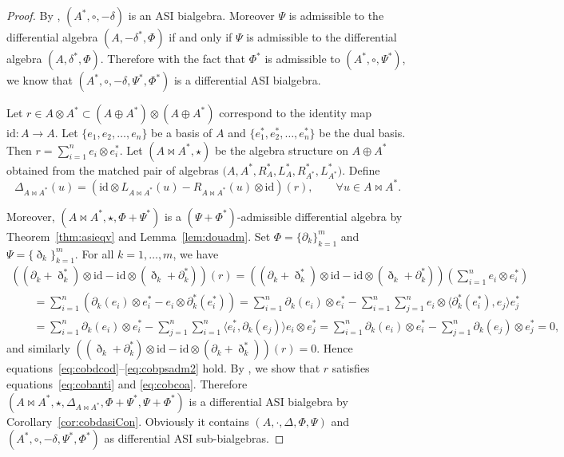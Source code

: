 \documentclass[10pt,a4paper]{amsart}
\numberwithin{equation}{section}
\newcommand{\id}{\mathrm{id}}
\begin{document}
\begin{proof}
 By \cite[Remark 2.2.4]{BaiDouble}, $(A^*, \circ,-\delta)$ is an ASI bialgebra.
 Moreover $\Psi$ is admissible to the differential algebra $(A, -\delta^*, \Phi)$ if and only if $\Psi$ is admissible to the differential algebra $(A, \delta^*, \Phi)$.
 Therefore with the fact that $\Phi^*$ is admissible to $(A^*, \circ, \Psi^*)$, we know that $(A^*, \circ, -\delta, \Psi^*, \Phi^*)$ is a differential ASI bialgebra.

 Let $r \in A \otimes A^* \subset (A \oplus A^*) \otimes (A \oplus A^*)$ correspond to the identity map $\id: A \to A$.
 Let $\{e_1,e_2,\dots,e_n\}$ be a basis of $A$ and $\{e_1^*,e_2^*,\dots,e_n^*\}$ be the dual basis.
 Then $r = \sum_{i=1}^n e_i \otimes e_i^*$.
 Let $(A \bowtie A^*, \star)$ be the algebra structure on $A \oplus A^*$ obtained from the matched pair of algebras $\big(A, A^*, R^*_A, L^*_A, R^*_{A^*}, L^*_{A^*}\big)$.
 Define
 \begin{equation*}
 \Delta_{A \bowtie A^{*}}(u) = (\id \otimes L_{A \bowtie A^{*}}(u) - R_{A \bowtie A^{*}}(u) \otimes \id)(r), \qquad \forall u \in A \bowtie A^{*}.
 \end{equation*}

	Moreover, $(A \bowtie A^*, \star, \Phi + \Psi^*)$ is a $(\Psi + \Phi^*)$-admissible differential algebra by Theorem~\ref{thm:asieqv} and Lemma~\ref{lem:douadm}.
 Set $\Phi = \{\partial_k\}_{k=1}^m$ and $\Psi = \{\eth_k\}_{k=1}^m$.
	For all $k=1, \dots, m$, we have
 \begin{gather*}
 ((\partial_k + \eth_k^*) \otimes \id - \id \otimes(\eth_k + \partial_k^*))(r) = ((\partial_k + \eth_k^*) \otimes \id - \id \otimes (\eth_k + \partial_k^*)) \left(\sum_{i=1}^n e_i \otimes e_i^*\right) \\
 \qquad{}= \sum_{i=1}^n (\partial_k(e_i) \otimes e_i^* - e_i \otimes \partial_k^*(e_i^*) ) = \sum_{i=1}^n \partial_k(e_i) \otimes e_i^* - \sum_{i=1}^n \sum_{j=1}^n e_i \otimes \langle\partial_k^*(e_i^*),e_j\rangle e_j^* \\
 \qquad{}= \sum_{i=1}^n \partial_k(e_i) \otimes e_i^* - \sum_{j=1}^n \sum_{i=1}^n \langle e_i^*, \partial_k(e_j) \rangle e_i \otimes e_j^* = \sum_{i=1}^n \partial_k(e_i)\otimes e_i^* -
 \sum_{j=1}^n \partial_k(e_j) \otimes e_j^* = 0,
	\end{gather*}
 and similarly $((\eth_k + \partial_k^*) \otimes \id - \id \otimes(\partial_k + \eth_k^*))(r) = 0$.
 Hence equations~\eqref{eq:cobdcod}--\eqref{eq:cobpsadm2} hold.
 By \cite[Theorem~2.3.6]{BaiDouble}, we show that $r$ satisfies equations~\eqref{eq:cobanti} and \eqref{eq:cobcoa}.
 Therefore $(A \bowtie A^*, \star, \Delta_{A \bowtie A^*}, \Phi + \Psi^*, \Psi + \Phi^*)$ is a differential ASI bialgebra by Corollary~\ref{cor:cobdasiCon}.
 Obviously it contains $(A, \cdot, \Delta, \Phi, \Psi)$ and $(A^*, \circ, -\delta, \Psi^*, \Phi^*)$ as differential ASI sub-bialgebras.
\end{proof}
\end{document}

